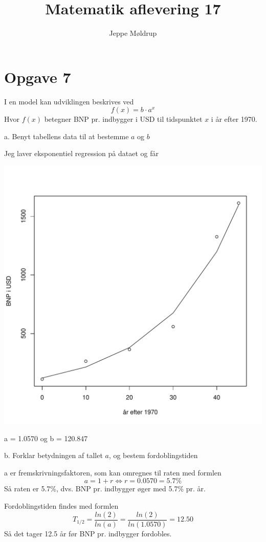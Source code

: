 \documentclass[12pt]{article}
\title{Matematik aflevering 17}
\author{Jeppe Møldrup}
\date{}
\begin{document}
\maketitle{}

\section*{Opgave 7}

I en model kan udviklingen beskrives ved
$$f(x) = b\cdot a^x$$
Hvor $f(x)$ betegner BNP pr. indbygger i USD til tidspunktet $x$ i år efter 1970.

a. Benyt tabellens data til at bestemme $a$ og $b$

Jeg laver eksponentiel regression på dataet og får

\includegraphics[width=\textwidth]{dia/7a.pdf}

a = 1.0570 og b = 120.847

b. Forklar betydningen af tallet $a$, og bestem fordoblingstiden

a er fremskrivningsfaktoren, som kan omregnes til raten med formlen
$$a = 1+r \Leftrightarrow r = 0.0570 = 5.7\%$$
Så raten er 5.7\%, dvs. BNP pr. indbygger øger med 5.7\% pr. år.

Fordoblingstiden findes med formlen
$$T_{1/2} = \frac{ln(2)}{ln(a)} = \frac{ln(2)}{ln(1.0570)} = 12.50$$
Så det tager 12.5 år før BNP pr. indbygger fordobles.
\end{document}
